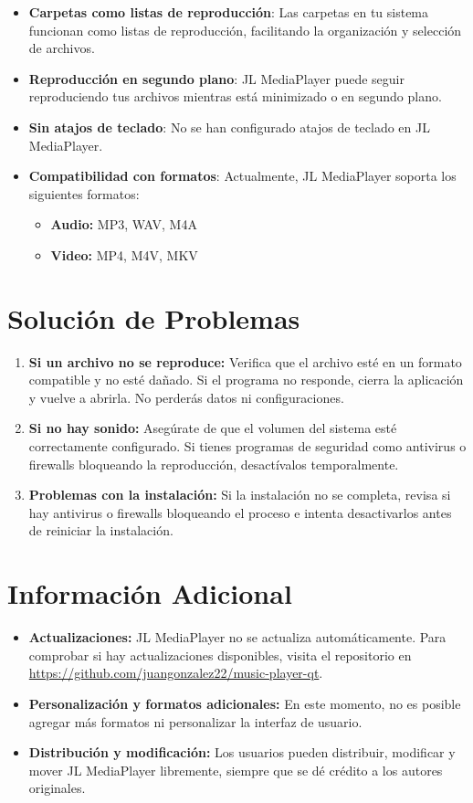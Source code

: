 \documentclass[a4paper,12pt]{article}
\begin{document}
\begin{itemize}
    \item \textbf{Carpetas como listas de reproducción}: Las carpetas en tu sistema funcionan como listas de reproducción, facilitando la organización y selección de archivos.
    \item \textbf{Reproducción en segundo plano}: JL MediaPlayer puede seguir reproduciendo tus archivos mientras está minimizado o en segundo plano.
    \item \textbf{Sin atajos de teclado}: No se han configurado atajos de teclado en JL MediaPlayer.
    \item \textbf{Compatibilidad con formatos}: Actualmente, JL MediaPlayer soporta los siguientes formatos:
    \begin{itemize}
        \item \textbf{Audio:} MP3, WAV, M4A
        \item \textbf{Video:} MP4, M4V, MKV
    \end{itemize}
\end{itemize}

\section*{Solución de Problemas}

\begin{enumerate}
    \item \textbf{Si un archivo no se reproduce:} Verifica que el archivo esté en un formato compatible y no esté dañado. Si el programa no responde, cierra la aplicación y vuelve a abrirla. No perderás datos ni configuraciones.
    \item \textbf{Si no hay sonido:} Asegúrate de que el volumen del sistema esté correctamente configurado. Si tienes programas de seguridad como antivirus o firewalls bloqueando la reproducción, desactívalos temporalmente.
    \item \textbf{Problemas con la instalación:} Si la instalación no se completa, revisa si hay antivirus o firewalls bloqueando el proceso e intenta desactivarlos antes de reiniciar la instalación.
\end{enumerate}

\section*{Información Adicional}

\begin{itemize}
    \item \textbf{Actualizaciones:} JL MediaPlayer no se actualiza automáticamente. Para comprobar si hay actualizaciones disponibles, visita el repositorio en \url{https://github.com/juangonzalez22/music-player-qt}.
    \item \textbf{Personalización y formatos adicionales:} En este momento, no es posible agregar más formatos ni personalizar la interfaz de usuario.
    \item \textbf{Distribución y modificación:} Los usuarios pueden distribuir, modificar y mover JL MediaPlayer libremente, siempre que se dé crédito a los autores originales.
\end{itemize}
\end{document}
